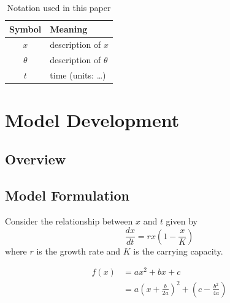 \documentclass[12pt, letterpaper]{article}
\begin{document}
\begin{table}[H]
    \centering
    \caption{Notation used in this paper}
    \begin{tabular}{cl}
        \toprule
        \textbf{Symbol} & \textbf{Meaning} \\
        \midrule
        $x$        & description of $x$ \\
        $\theta$   & description of $\theta$ \\
        $t$        & time (units: \dots) \\
        \bottomrule
    \end{tabular}
    \label{tab:notation}
\end{table}

\section{Model Development}

\subsection{Overview}

\subsection{Model Formulation}

Consider the relationship between $x$ and $t$ given by
\begin{equation}
    \frac{dx}{dt} = r x \left(1 - \frac{x}{K}\right)
    \label{eq:logistic}
\end{equation}
where $r$ is the growth rate and $K$ is the carrying capacity.

\begin{align}
    f(x) &= a x^2 + bx + c \\
         &= a\left(x + \frac{b}{2a}\right)^2 + \left(c - \frac{b^2}{4a}\right)
\end{align}
\end{document}
